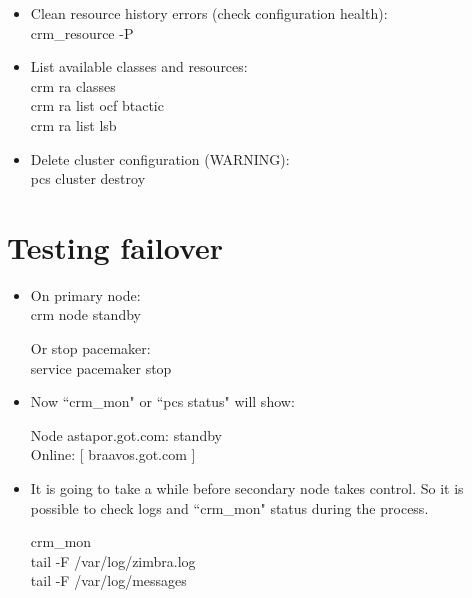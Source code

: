 \documentclass[a4paper, 12pt]{book}
\begin{document}
\begin{itemize}
	\item Clean resource history errors (check configuration health):\\
		crm\_resource -P
\end{itemize}

\begin{itemize}
	\item List available classes and resources:\\
		crm ra classes\\
		crm ra list ocf btactic\\
		crm ra list lsb
\end{itemize}

\begin{itemize}
	\item Delete cluster configuration (WARNING):\\
		pcs cluster destroy
\end{itemize}

\section{Testing failover}
\label{sec:failover}


\begin{itemize}
	\item On primary node:\\
	crm node standby
		
	Or stop pacemaker:\\
	service pacemaker stop

\end{itemize}


\begin{itemize}
	\item Now ``crm\_mon" or ``pcs status" will show:
	
		Node astapor.got.com: standby\\
		Online: [ braavos.got.com ]
\end{itemize}


\begin{itemize}
	\item It is going to take a while before secondary node takes control. So it is possible to check logs and ``crm\_mon" status during the process.
	
		crm\_mon\\
		tail -F /var/log/zimbra.log\\
		tail -F /var/log/messages
\end{itemize}
\end{document}
